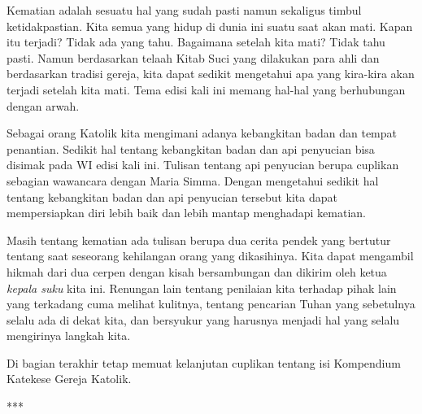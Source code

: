 \newpage



Kematian adalah sesuatu hal yang sudah pasti namun sekaligus timbul ketidakpastian. Kita semua yang hidup di dunia ini suatu saat akan mati. Kapan itu terjadi? Tidak ada yang tahu. Bagaimana setelah kita mati? Tidak tahu pasti. Namun berdasarkan telaah Kitab Suci yang dilakukan para ahli dan berdasarkan tradisi gereja, kita dapat sedikit mengetahui apa yang kira-kira akan terjadi setelah kita mati. Tema edisi kali ini memang hal-hal yang berhubungan dengan arwah.

Sebagai orang Katolik kita mengimani adanya kebangkitan badan dan tempat penantian. Sedikit hal tentang kebangkitan badan dan api penyucian bisa disimak pada WI edisi kali ini. Tulisan tentang api penyucian berupa cuplikan sebagian wawancara dengan Maria Simma. Dengan mengetahui sedikit hal tentang kebangkitan badan dan api penyucian tersebut kita dapat mempersiapkan diri lebih baik dan lebih mantap menghadapi kematian.

Masih tentang kematian ada tulisan berupa dua cerita pendek yang bertutur tentang saat seseorang kehilangan orang yang dikasihinya. Kita dapat mengambil hikmah dari dua cerpen dengan kisah bersambungan dan dikirim oleh ketua \textit{kepala suku} kita ini. Renungan lain tentang penilaian kita terhadap pihak lain yang terkadang cuma melihat kulitnya, tentang pencarian Tuhan yang sebetulnya selalu ada di dekat kita, dan bersyukur yang harusnya menjadi hal yang selalu mengirinya langkah kita.  

Di bagian terakhir tetap memuat kelanjutan cuplikan tentang isi Kompendium Katekese Gereja Katolik.

\begin{center}***\end{center} 

\vfill



